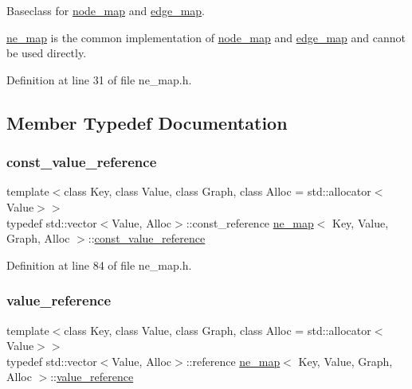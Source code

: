 Baseclass for \mbox{\hyperlink{classnode__map}{node\+\_\+map}} and \mbox{\hyperlink{classedge__map}{edge\+\_\+map}}. 

\mbox{\hyperlink{classne__map}{ne\+\_\+map}} is the common implementation of {\ttfamily \mbox{\hyperlink{classnode__map}{node\+\_\+map}} } and {\ttfamily \mbox{\hyperlink{classedge__map}{edge\+\_\+map}} } and cannot be used directly. 

Definition at line 31 of file ne\+\_\+map.\+h.



\subsection{Member Typedef Documentation}
\mbox{\label{classne__map_ad2be1a01de53940aee1282ec0e34f0f7}} 
\subsubsection{\texorpdfstring{const\+\_\+value\+\_\+reference}{const\_value\_reference}}
{\footnotesize\ttfamily template$<$class Key, class Value, class Graph, class Alloc = std\+::allocator$<$\+Value$>$$>$ \\
typedef std\+::vector$<$Value, Alloc$>$\+::const\+\_\+reference \mbox{\hyperlink{classne__map}{ne\+\_\+map}}$<$ Key, Value, Graph, Alloc $>$\+::\mbox{\hyperlink{classne__map_ad2be1a01de53940aee1282ec0e34f0f7}{const\+\_\+value\+\_\+reference}}}



Definition at line 84 of file ne\+\_\+map.\+h.

\mbox{\label{classne__map_a3de60750d102f8992a215b0fe645014d}} 
\subsubsection{\texorpdfstring{value\+\_\+reference}{value\_reference}}
{\footnotesize\ttfamily template$<$class Key, class Value, class Graph, class Alloc = std\+::allocator$<$\+Value$>$$>$ \\
typedef std\+::vector$<$Value, Alloc$>$\+::reference \mbox{\hyperlink{classne__map}{ne\+\_\+map}}$<$ Key, Value, Graph, Alloc $>$\+::\mbox{\hyperlink{classne__map_a3de60750d102f8992a215b0fe645014d}{value\+\_\+reference}}}



